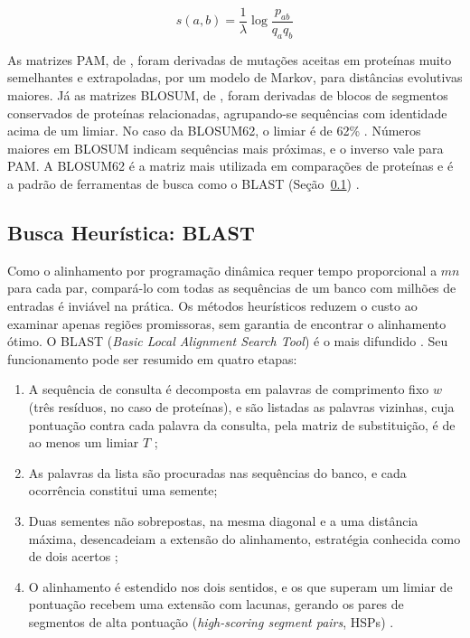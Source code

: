 \begin{equation}
	s(a,b) = \frac{1}{\lambda} \log \frac{p_{ab}}{q_a q_b}
	\label{eq:logodds}
\end{equation}

As matrizes PAM, de , foram derivadas de mutações aceitas em proteínas muito semelhantes e extrapoladas, por um modelo de Markov, para distâncias evolutivas maiores. Já as matrizes BLOSUM, de , foram derivadas de blocos de segmentos conservados de proteínas relacionadas, agrupando-se sequências com identidade acima de um limiar. No caso da BLOSUM62, o limiar é de 62\% \cite{Henikoff1992}. Números maiores em BLOSUM indicam sequências mais próximas, e o inverso vale para PAM. A BLOSUM62 é a matriz mais utilizada em comparações de proteínas e é a padrão de ferramentas de busca como o BLAST (Seção~\ref{subsec:blast}) \cite{Altschul1997}.

\subsection{Busca Heurística: BLAST}
\label{subsec:blast}

Como o alinhamento por programação dinâmica requer tempo proporcional a $mn$ para cada par, compará-lo com todas as sequências de um banco com milhões de entradas é inviável na prática. Os métodos heurísticos reduzem o custo ao examinar apenas regiões promissoras, sem garantia de encontrar o alinhamento ótimo. O BLAST (\textit{Basic Local Alignment Search Tool}) é o mais difundido \cite{Altschul1990}. Seu funcionamento pode ser resumido em quatro etapas:

\begin{enumerate}
	\item A sequência de consulta é decomposta em palavras de comprimento fixo $w$ (três resíduos, no caso de proteínas), e são listadas as palavras vizinhas, cuja pontuação contra cada palavra da consulta, pela matriz de substituição, é de ao menos um limiar $T$ \cite{Altschul1990};
	\item As palavras da lista são procuradas nas sequências do banco, e cada ocorrência constitui uma semente;
	\item Duas sementes não sobrepostas, na mesma diagonal e a uma distância máxima, desencadeiam a extensão do alinhamento, estratégia conhecida como de dois acertos \cite{Altschul1997};
	\item O alinhamento é estendido nos dois sentidos, e os que superam um limiar de pontuação recebem uma extensão com lacunas, gerando os pares de segmentos de alta pontuação (\textit{high-scoring segment pairs}, HSPs) \cite{Altschul1997}.
\end{enumerate}

